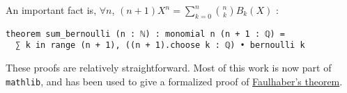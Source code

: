 \documentclass[a4paper,UKenglish,cleveref, autoref, thm-restate]{lipics-v2021}
\newcommand{\lean}[1]{\texttt{#1}\xspace} %
\begin{document}

An important fact is, $\forall n$, $(n + 1)X^{n} = \sum_{k = 0}^{n} {n \choose k} B_k(X)$ :
\begin{lstlisting}
theorem sum_bernoulli (n : ℕ) : monomial n (n + 1 : ℚ) = 
  ∑ k in range (n + 1), ((n + 1).choose k : ℚ) • bernoulli k 
\end{lstlisting}
These proofs are relatively straightforward. Most of this work is now part of \lean{mathlib}, 
and has been used to give a formalized proof of \href{https://leanprover-community.github.io/mathlib_docs/number_theory/bernoulli.html\#sum_range_pow}{Faulhaber's theorem}.
\end{document}
